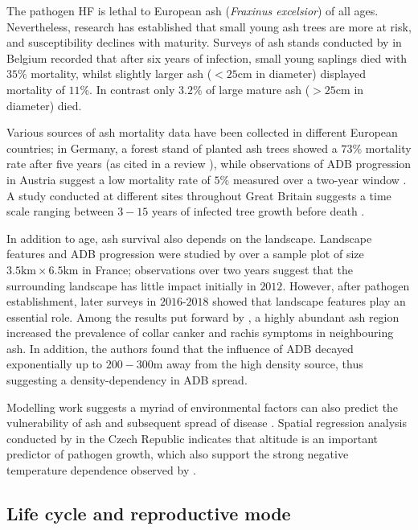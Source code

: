 The pathogen HF is lethal to European ash (\textit{Fraxinus excelsior}) of all ages. 
Nevertheless, research has established that small young ash trees are more at risk,
and susceptibility declines with maturity. Surveys of ash stands conducted by \cite{marccais2017estimation} 
in Belgium recorded that after six years of infection, small young saplings died with $35\%$ mortality, 
whilst slightly larger ash ($<25 \mathrm{cm}$ in diameter) displayed mortality of $11\%$. 
In contrast only $3.2\%$ of large mature ash ($>25\mathrm{cm}$ in diameter) died.

Various sources of ash mortality data have been collected in different European countries;
in Germany, a forest stand of planted ash trees showed a $73\%$
mortality rate after five years \cite{langer2015ash} (as cited in a review
\cite{enderle2017ash}), while observations of ADB progression in Austria
suggest a low mortality rate of $5\%$ measured over a two-year window \cite{kessler2012dieback}. 
A study conducted at different sites throughout Great Britain suggests a time scale ranging between 
$3-15$ years of infected tree growth before death \cite{wylder2018evidence}.

In addition to age, ash survival also depends on the landscape. 
Landscape features and ADB progression were studied by \cite{https://doi.org/10.1111/1365-2745.13383} 
over a sample plot of size  $\mathrm{3.5km \times 6.5 km}$ in France; observations over two years
suggest that the surrounding landscape has little impact initially in $2012$. However, after pathogen establishment, 
later surveys in $2016$-$2018$ showed that landscape features play an essential role.
Among the results put forward by \cite{https://doi.org/10.1111/1365-2745.13383}, 
a highly abundant ash region increased the prevalence of collar canker and rachis symptoms in neighbouring ash.
In addition, the authors found that the influence of ADB decayed exponentially up to $200-300\mathrm{m}$ away from the high density source,
thus suggesting a density-dependency in ADB spread.

Modelling work suggests a myriad of environmental factors can also predict the
vulnerability of ash and subsequent spread of disease \cite{dal2014risk}.
Spatial regression analysis conducted by \cite{chumanova2019predicting} in the Czech Republic indicates that altitude 
is an important predictor of pathogen growth, which also support the strong negative temperature dependence observed by \cite{hauptman2013temperature}.

\subsection{Life cycle and reproductive mode}

